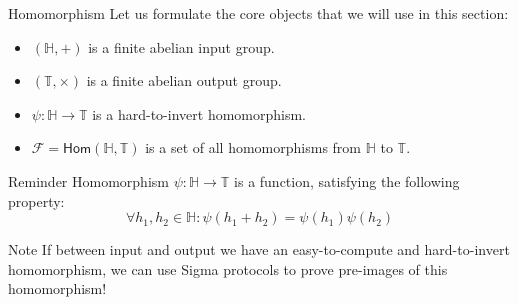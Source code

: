 \documentclass[xcolor={usenames,dvipsnames}]{beamer}
\begin{document}
    \begin{frame}{Homomorphism}
        Let us formulate the core objects that we will use in this section:
        \begin{itemize}
            \item $(\mathbb{H}, +)$ is a finite abelian input group.
            \item $(\mathbb{T}, \times)$ is a finite abelian output group.
            \item $\psi: \mathbb{H} \to \mathbb{T}$ is a hard-to-invert homomorphism.
            \item $\mathcal{F} = \mathsf{Hom}(\mathbb{H}, \mathbb{T})$ is a set of all homomorphisms from $\mathbb{H}$ to $\mathbb{T}$.
        \end{itemize}

        \begin{block}{Reminder}
            Homomorphism $\psi: \mathbb{H} \to \mathbb{T}$ is a function, satisfying the following property:
            \begin{equation*}
                \forall h_1, h_2 \in \mathbb{H}: \psi(h_1 + h_2) = \psi(h_1)\psi(h_2)
            \end{equation*}
        \end{block}

        \begin{alertblock}{Note}
            If between input and output we have an easy-to-compute and hard-to-invert homomorphism, we can use Sigma protocols to prove pre-images of this homomorphism!
        \end{alertblock}
    \end{frame}
\end{document}
